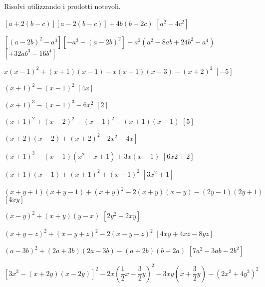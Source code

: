 \begin{esercizio}[\Ast]
 \label{ese:11.31}
Risolvi utilizzando i prodotti notevoli.
 \begin{enumeratea}
 \item 
$\left[a+2\left(b-c\right)\right]\left[a-2\left(b-c\right)\right]+4b(b-2c)$
  \hfill $\left[a^{2}-4c^{2}\right]$
 \item 
$\left[\left(a-2b\right)^{2}-a^{3}\right]\left[-a^{3}-\left(a-2b\right)^2\right]
+a^{2}(a^{2}-8{ab}+24b^{2}-a^{4})$
  \hfill $\left[+32ab^{3}-16b^{4}\right]$
 \item $x(x-1)^{2}+(x+1)(x-1)-x(x+1)(x-3)-(x+2)^{2}$
  \hfill $\left[-5\right]$
 \item $(x+1)^{2}-(x-1)^{2}$
  \hfill $\left[4x\right]$
 \item $(x+1)^{3}-(x-1)^{3}-6x^2$
  \hfill $\left[2\right]$
 \item $(x+1)^{2}+(x-2)^{2}-(x-1)^{2}-(x+1)(x-1)$
  \hfill $\left[5\right]$
 \item $(x+2)(x-2)+(x+2)^{2}$
  \hfill $\left[2x^{2}-4x\right]$
 \item $(x+1)^{3}-(x-1)\left(x^{2}+x+1\right)+3x(x-1)$
  \hfill $\left[6x{2}+2\right]$
 \item $(x+1)(x-1)+(x+1)^{2}+(x-1)^{2}$
  \hfill $\left[3x^{2}+1\right]$
 \item $(x+y+1)(x+y-1)+(x+y)^{2}-2(x+y)(x-y)-(2y-1)(2y+1)$
  \hfill $\left[4xy\right]$
% 
 \item $(x-y)^{2}+(x+y)(y-x)$
  \hfill $\left[2y^{2}-2xy\right]$
 \item $(x+y-z)^2+(x-y+z)^2-2(x-y-z)^2$
  \hfill $\left[4xy+4xz-8yz\right]$
 \item $(a-3b)^{2}+(2a+3b)(2a-3b)-(a+2b)(b-2a)$
  \hfill $\left[7a^2-3ab-2b^2\right]$
 \item 
$\left[3x^{2}-(x+2y)(x-2y)\right]^{2}-2x\left(\dfrac{1}{2}x-\dfrac{3}{2}
y\right)^{2}-3{xy}\left(x+\dfrac{3}{2}y\right)-\left(2x^{2}+4y^{2}\right)^{2}$

\end{enumeratea}
\end{esercizio}
